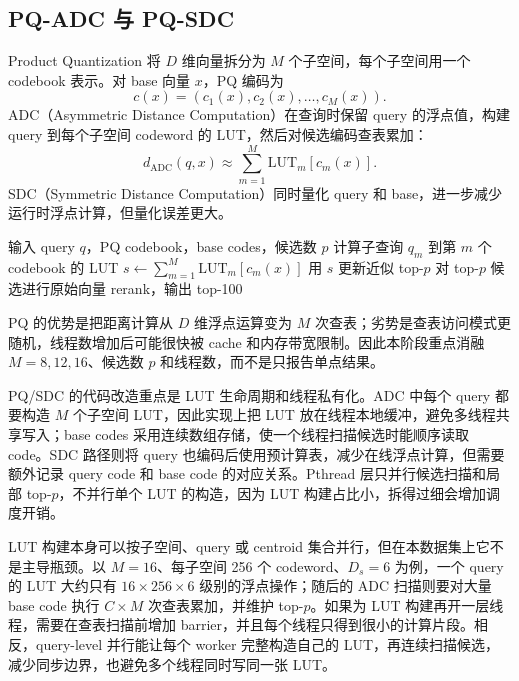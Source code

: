 \documentclass[11pt,a4paper]{article}
\begin{document}
\subsection{PQ-ADC 与 PQ-SDC}

Product Quantization 将 $D$ 维向量拆分为 $M$ 个子空间，每个子空间用一个 codebook 表示。对 base 向量 $x$，PQ 编码为
\[
c(x)=(c_1(x),c_2(x),\ldots,c_M(x)).
\]
ADC（Asymmetric Distance Computation）在查询时保留 query 的浮点值，构建 query 到每个子空间 codeword 的 LUT，然后对候选编码查表累加：
\[
d_{\mathrm{ADC}}(q,x)\approx \sum_{m=1}^{M} \mathrm{LUT}_m[c_m(x)].
\]
SDC（Symmetric Distance Computation）同时量化 query 和 base，进一步减少运行时浮点计算，但量化误差更大。

\begin{algorithm}[H]
\caption{PQ-ADC 查询}
\label{alg:pq_adc}
\begin{algorithmic}[1]
\State 输入 query $q$，PQ codebook，base codes，候选数 $p$
  \State 计算子查询 $q_m$ 到第 $m$ 个 codebook 的 LUT
\EndFor
{}
  \State $s \gets \sum_{m=1}^{M}\mathrm{LUT}_m[c_m(x)]$
  \State 用 $s$ 更新近似 top-$p$
\EndFor
\State 对 top-$p$ 候选进行原始向量 rerank，输出 top-100
\end{algorithmic}
\end{algorithm}

PQ 的优势是把距离计算从 $D$ 维浮点运算变为 $M$ 次查表；劣势是查表访问模式更随机，线程数增加后可能很快被 cache 和内存带宽限制。因此本阶段重点消融 $M=8,12,16$、候选数 $p$ 和线程数，而不是只报告单点结果。

PQ/SDC 的代码改造重点是 LUT 生命周期和线程私有化。ADC 中每个 query 都要构造 $M$ 个子空间 LUT，因此实现上把 LUT 放在线程本地缓冲，避免多线程共享写入；base codes 采用连续数组存储，使一个线程扫描候选时能顺序读取 code。SDC 路径则将 query 也编码后使用预计算表，减少在线浮点计算，但需要额外记录 query code 和 base code 的对应关系。Pthread 层只并行候选扫描和局部 top-$p$，不并行单个 LUT 的构造，因为 LUT 构建占比小，拆得过细会增加调度开销。

LUT 构建本身可以按子空间、query 或 centroid 集合并行，但在本数据集上它不是主导瓶颈。以 $M=16$、每子空间 256 个 codeword、$D_s=6$ 为例，一个 query 的 LUT 大约只有 $16\times256\times6$ 级别的浮点操作；随后的 ADC 扫描则要对大量 base code 执行 $C\times M$ 次查表累加，并维护 top-$p$。如果为 LUT 构建再开一层线程，需要在查表扫描前增加 barrier，并且每个线程只得到很小的计算片段。相反，query-level 并行能让每个 worker 完整构造自己的 LUT，再连续扫描候选，减少同步边界，也避免多个线程同时写同一张 LUT。
\end{document}
